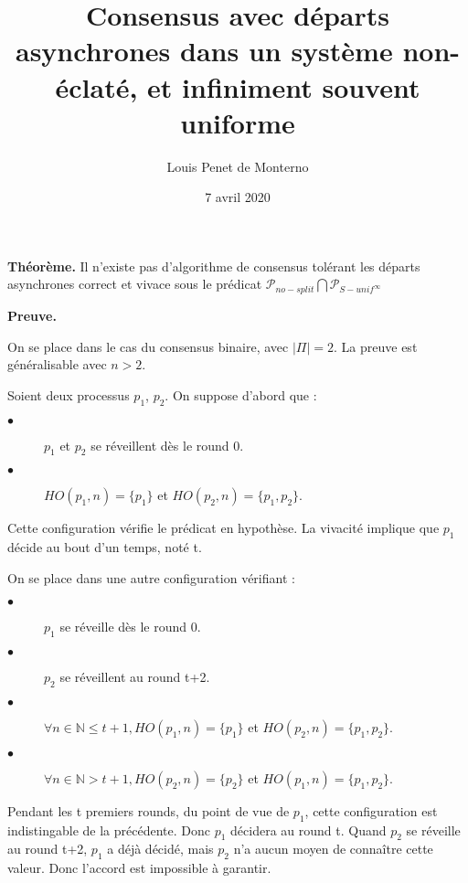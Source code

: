 \documentclass{article}
\title{Consensus avec départs asynchrones dans un système non-éclaté, et infiniment souvent uniforme}
\date{7 avril 2020}
\author{Louis Penet de Monterno}
\begin{document}
  \maketitle

  \textbf{Théorème.} Il n'existe pas d'algorithme de consensus tolérant les départs asynchrones
  correct et vivace sous le prédicat $\mathcal{P}_{no-split} \bigcap \mathcal{P}_{S-unif^\infty}$

  \textbf{Preuve.}

  On se place dans le cas du consensus binaire, avec $ | \Pi | = 2$.
  La preuve est généralisable avec $n > 2$.

  Soient deux processus $p_1$, $p_2$. On suppose d'abord que :

  \begin{description}

	  \item[$\bullet$] $p_1$ et $p_2$ se réveillent dès le round 0.
	  \item[$\bullet$] $ HO(p_1, n) = \{ p_1 \}$ et $HO(p_2, n) = \{ p_1, p_2\}$.

  \end{description}

  Cette configuration vérifie le prédicat en hypothèse.
  La vivacité implique que $p_1$ décide au bout d'un temps, noté t.

  \vspace{1cm}
  On se place dans une autre configuration vérifiant :

  \begin{description}

	  \item[$\bullet$] $p_1$ se réveille dès le round 0.
	  \item[$\bullet$] $p_2$ se réveillent au round t+2.
	  \item[$\bullet$] $\forall n \in \mathds{N} \leq t+1 , 
		  HO(p_1, n) = \{ p_1 \}$ et $HO(p_2, n) = \{ p_1, p_2\}$.
	  \item[$\bullet$] $\forall n \in \mathds{N} > t+1 ,
		  HO(p_2, n) = \{ p_2 \}$ et $HO(p_1, n) = \{ p_1, p_2\}$.

  \end{description}

  Pendant les t premiers rounds, du point de vue de $p_1$,
  cette configuration est indistingable de la précédente.
  Donc $p_1$ décidera au round t. Quand $p_2$ se réveille au round t+2,
  $p_1$ a déjà décidé, mais $p_2$ n'a aucun moyen de connaître cette valeur.
  Donc l'accord est impossible à garantir.
\end{document}
